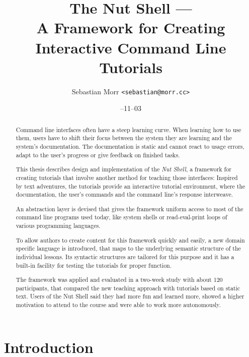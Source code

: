 \documentclass[paper=a4,twoside,abstract=on,cleardoublepage=empty,numbers=noenddot,toc=bib,12pt,appendixprefix=true]{scrreprt}
\title{The Nut Shell ---\\A Framework for Creating\\Interactive Command Line Tutorials}
\author{\sffamily Sebastian Morr \texttt{<sebastian@morr.cc>}}
\date{\sffamily 2013--11--03}
\begin{document}
\maketitle
\restoregeometry


\begin{abstract}
    Command line interfaces often have a steep learning curve. When learning how to use them, users have to shift their focus between the system they are learning and the system's documentation. The documentation is static and cannot react to usage errors, adapt to the user's progress or give feedback on finished tasks.

    This thesis describes design and implementation of the \emph{Nut Shell}, a framework for creating tutorials that involve another method for teaching those interfaces: Inspired by text adventures, the tutorials provide an interactive tutorial environment, where the documentation, the user's commands and the command line's response interweave.

    An abstraction layer is devised that gives the framework uniform access to most of the command line programs used today, like system shells or read-eval-print loops of various programming languages.

    To allow authors to create content for this framework quickly and easily, a new domain specific language is introduced, that maps to the underlying semantic structure of the individual lessons. Its syntactic structures are tailored for this purpose and it has a built-in facility for testing the tutorials for proper function.

    The framework was applied and evaluated in a two-week study with about 120 participants, that compared the new teaching approach with tutorials based on static text. Users of the Nut Shell said they had more fun and learned more, showed a higher motivation to attend to the course and were able to work more autonomously.
\end{abstract}

%
\begin{abstract}
\end{abstract}
%

\setcounter{tocdepth}{2}
\tableofcontents
\listoffigures

\chapter{Introduction}
\end{document}
